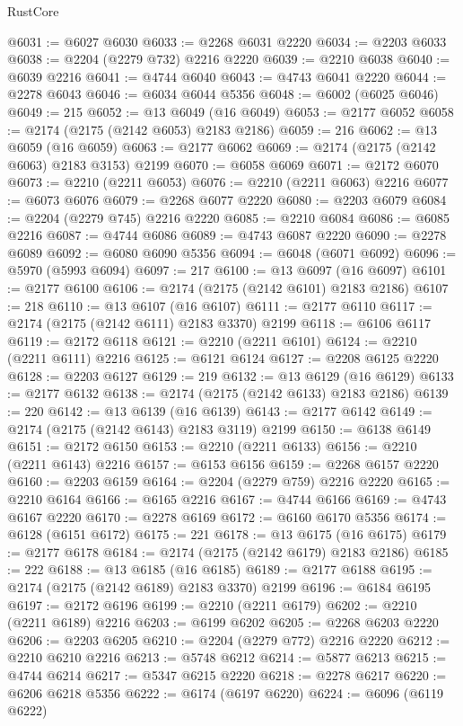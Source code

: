 \begin{lexlean}{RustCore}
\begin{coremodule}
@6031 := @6027 @6030
@6033 := @2268 @6031 @2220
@6034 := @2203 @6033
@6038 := @2204 (@2279 @732) @2216 @2220
@6039 := @2210 @6038
@6040 := @6039 @2216
@6041 := @4744 @6040
@6043 := @4743 @6041 @2220
@6044 := @2278 @6043
@6046 := @6034 @6044 @5356
@6048 := @6002 (@6025 @6046)
@6049 := 215
@6052 := @13 @6049 (@16 @6049)
@6053 := @2177 @6052
@6058 := @2174 (@2175 (@2142 @6053) @2183 @2186)
@6059 := 216
@6062 := @13 @6059 (@16 @6059)
@6063 := @2177 @6062
@6069 := @2174 (@2175 (@2142 @6063) @2183 @3153) @2199
@6070 := @6058 @6069
@6071 := @2172 @6070
@6073 := @2210 (@2211 @6053)
@6076 := @2210 (@2211 @6063) @2216
@6077 := @6073 @6076
@6079 := @2268 @6077 @2220
@6080 := @2203 @6079
@6084 := @2204 (@2279 @745) @2216 @2220
@6085 := @2210 @6084
@6086 := @6085 @2216
@6087 := @4744 @6086
@6089 := @4743 @6087 @2220
@6090 := @2278 @6089
@6092 := @6080 @6090 @5356
@6094 := @6048 (@6071 @6092)
@6096 := @5970 (@5993 @6094)
@6097 := 217
@6100 := @13 @6097 (@16 @6097)
@6101 := @2177 @6100
@6106 := @2174 (@2175 (@2142 @6101) @2183 @2186)
@6107 := 218
@6110 := @13 @6107 (@16 @6107)
@6111 := @2177 @6110
@6117 := @2174 (@2175 (@2142 @6111) @2183 @3370) @2199
@6118 := @6106 @6117
@6119 := @2172 @6118
@6121 := @2210 (@2211 @6101)
@6124 := @2210 (@2211 @6111) @2216
@6125 := @6121 @6124
@6127 := @2208 @6125 @2220
@6128 := @2203 @6127
@6129 := 219
@6132 := @13 @6129 (@16 @6129)
@6133 := @2177 @6132
@6138 := @2174 (@2175 (@2142 @6133) @2183 @2186)
@6139 := 220
@6142 := @13 @6139 (@16 @6139)
@6143 := @2177 @6142
@6149 := @2174 (@2175 (@2142 @6143) @2183 @3119) @2199
@6150 := @6138 @6149
@6151 := @2172 @6150
@6153 := @2210 (@2211 @6133)
@6156 := @2210 (@2211 @6143) @2216
@6157 := @6153 @6156
@6159 := @2268 @6157 @2220
@6160 := @2203 @6159
@6164 := @2204 (@2279 @759) @2216 @2220
@6165 := @2210 @6164
@6166 := @6165 @2216
@6167 := @4744 @6166
@6169 := @4743 @6167 @2220
@6170 := @2278 @6169
@6172 := @6160 @6170 @5356
@6174 := @6128 (@6151 @6172)
@6175 := 221
@6178 := @13 @6175 (@16 @6175)
@6179 := @2177 @6178
@6184 := @2174 (@2175 (@2142 @6179) @2183 @2186)
@6185 := 222
@6188 := @13 @6185 (@16 @6185)
@6189 := @2177 @6188
@6195 := @2174 (@2175 (@2142 @6189) @2183 @3370) @2199
@6196 := @6184 @6195
@6197 := @2172 @6196
@6199 := @2210 (@2211 @6179)
@6202 := @2210 (@2211 @6189) @2216
@6203 := @6199 @6202
@6205 := @2268 @6203 @2220
@6206 := @2203 @6205
@6210 := @2204 (@2279 @772) @2216 @2220
@6212 := @2210 @6210 @2216
@6213 := @5748 @6212
@6214 := @5877 @6213
@6215 := @4744 @6214
@6217 := @5347 @6215 @2220
@6218 := @2278 @6217
@6220 := @6206 @6218 @5356
@6222 := @6174 (@6197 @6220)
@6224 := @6096 (@6119 @6222)

\end{coremodule}
\end{lexlean}
